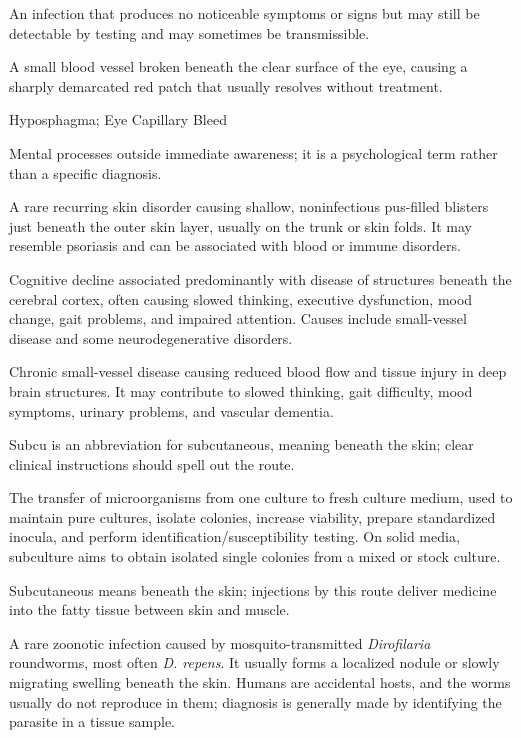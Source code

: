  An infection that produces no noticeable symptoms or signs but may still be detectable by testing and may sometimes be transmissible.

 A small blood vessel broken beneath the clear surface of the eye, causing a sharply demarcated red patch that usually resolves without treatment.

\synonyms
Hyposphagma; Eye Capillary Bleed

 Mental processes outside immediate awareness; it is a psychological term rather than a specific diagnosis.

 A rare recurring skin disorder causing shallow, noninfectious pus-filled blisters just beneath the outer skin layer, usually on the trunk or skin folds. It may resemble psoriasis and can be associated with blood or immune disorders.

 Cognitive decline associated predominantly with disease of structures beneath the cerebral cortex, often causing slowed thinking, executive dysfunction, mood change, gait problems, and impaired attention. Causes include small-vessel disease and some neurodegenerative disorders.

 Chronic small-vessel disease causing reduced blood flow and tissue injury in deep brain structures. It may contribute to slowed thinking, gait difficulty, mood symptoms, urinary problems, and vascular dementia.

 Subcu is an abbreviation for subcutaneous, meaning beneath the skin; clear clinical instructions should spell out the route.

 The transfer of microorganisms from one culture to fresh culture medium, used to
maintain pure cultures, isolate colonies, increase viability, prepare standardized
inocula, and perform identification/susceptibility testing. On solid media, subculture
aims to obtain isolated single colonies from a mixed or stock culture.

 Subcutaneous means beneath the skin; injections by this route deliver medicine into the fatty tissue between skin and muscle.

 A rare zoonotic infection caused by mosquito-transmitted \textit{Dirofilaria} roundworms, most often \textit{D. repens}. It usually forms a localized nodule or slowly migrating swelling beneath the skin. Humans are accidental hosts, and the worms usually do not reproduce in them; diagnosis is generally made by identifying the parasite in a tissue sample.

